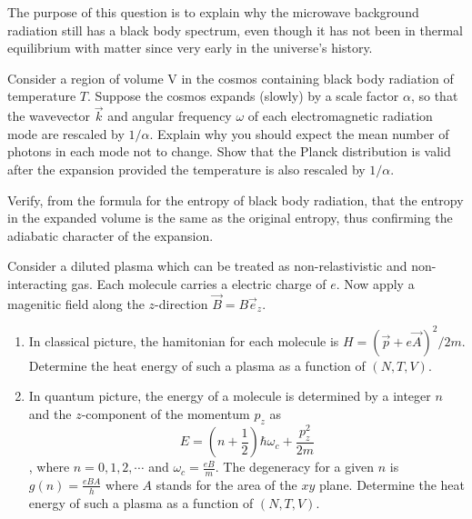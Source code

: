 \documentclass[CJK]{beamer}
\begin{document}
\begin{frame}
\bch
The purpose of this question is to explain why the microwave background radiation
still has a black body spectrum, even though it has not been in thermal equilibrium
with matter since very early in the universe’s history.\par
Consider a region of volume V in the cosmos containing black body radiation of
temperature $T$. Suppose the cosmos expands (slowly) by a scale factor $\alpha$, so that
the wavevector $\vec{k}$ and angular frequency $\omega$ of each electromagnetic radiation mode are
rescaled by $1/\alpha$. Explain why you should expect the mean number of photons in each
mode not to change. Show that the Planck distribution is valid after the expansion
provided the temperature is also rescaled by $1/\alpha$.\par
Verify, from the formula for the entropy of black body radiation, that the entropy in
the expanded volume is the same as the original entropy, thus confirming the adiabatic
character of the expansion.

\ech
\end{frame}

\begin{frame}
\bch
Consider a diluted plasma which can be treated as non-relastivistic and non-interacting gas. Each molecule carries a electric charge of $e$. Now apply a magenitic field along the $z$-direction $\vec{B} = B\vec{e}_z$.
\begin{enumerate}
\item In classical picture, the hamitonian for each molecule is $H = \left(\vec{p} + e \vec{A}\right)^2/2m$. Determine the heat energy of such a plasma as a function of $(N,T,V)$.
\item In quantum picture, the energy of a molecule is determined by a integer $n$ and the $z$-component of the momentum $p_z$ as $$E = \left(n + \frac{1}{2}\right) \hbar \omega_c + \frac{p_z^2}{2m}$$, where $n = 0,1,2,\cdots$ and $\omega_c = \frac{eB}{m}$. The degeneracy for a given $n$ is $g(n) = \frac{eB A}{h}$ where $A$ stands for the area of the $xy$ plane. Determine the heat energy of such a plasma as a function of $(N,T,V)$.
\end{enumerate}
\ech
\end{frame}
\end{document}
